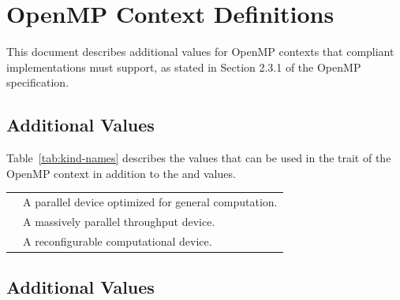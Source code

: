     \setcounter{page}{0}
    \linenumbers
    
\chapter{OpenMP \relatedomp{} Context Definitions}
    
This document describes additional values for OpenMP contexts that
compliant implementations must support, as stated in Section 2.3.1 
of the OpenMP \relatedomp{} specification.

\section{Additional  Values}
    
Table~\ref{tab:kind-names} describes the  values that can be used in the  trait of the OpenMP context in addition to the  and  values.
    
\nolinenumbers
\renewcommand{\arraystretch}{1.5}
\tablelasttail{\hline}
\begin{supertabular}{p{1in}p{3in}}
  & A parallel device optimized for general computation.\\
  & A massively parallel throughput device.\\
 & A reconfigurable computational device.\\
\end{supertabular}
\linenumbers

\vspace{1cm}

\section{Additional  Values}


